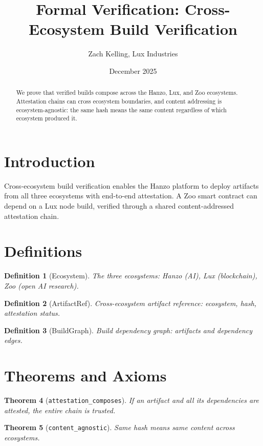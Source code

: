 \documentclass[11pt]{article}
\title{Formal Verification: Cross-Ecosystem Build Verification}
\author{Zach Kelling, Lux Industries}
\date{December 2025}
\newtheorem{theorem}{Theorem}
\newtheorem{definition}[theorem]{Definition}
\begin{document}
\maketitle

\begin{abstract}
We prove that verified builds compose across the Hanzo, Lux, and Zoo ecosystems. Attestation chains can cross ecosystem boundaries, and content addressing is ecosystem-agnostic: the same hash means the same content regardless of which ecosystem produced it.
\end{abstract}

\section{Introduction}
Cross-ecosystem build verification enables the Hanzo platform to deploy artifacts from all three ecosystems with end-to-end attestation. A Zoo smart contract can depend on a Lux node build, verified through a shared content-addressed attestation chain.

\section{Definitions}
\begin{definition}[Ecosystem]
The three ecosystems: Hanzo (AI), Lux (blockchain), Zoo (open AI research).
\end{definition}

\begin{definition}[ArtifactRef]
Cross-ecosystem artifact reference: ecosystem, hash, attestation status.
\end{definition}

\begin{definition}[BuildGraph]
Build dependency graph: artifacts and dependency edges.
\end{definition}


\section{Theorems and Axioms}
\begin{theorem}[\texttt{attestation\_composes}]
If an artifact and all its dependencies are attested, the entire chain is trusted.
\end{theorem}

\begin{theorem}[\texttt{content\_agnostic}]
Same hash means same content across ecosystems.
\end{theorem}
\end{document}
